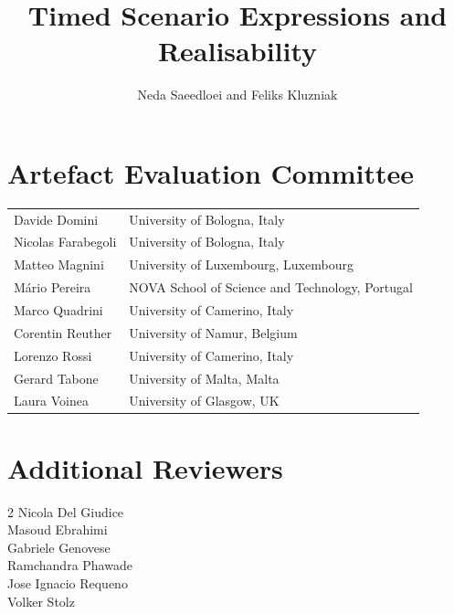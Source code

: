 \documentclass[runningheads]{llncs}
\begin{document}
\section*{Artefact Evaluation Committee}
\begin{longtable}{p{}p{}}
Davide Domini & University of Bologna, Italy \\
Nicolas Farabegoli & University of Bologna, Italy\\
Matteo Magnini & University of Luxembourg, Luxembourg\\
Mário Pereira & NOVA School of Science and Technology, Portugal\\
Marco Quadrini & University of Camerino, Italy\\
Corentin Reuther & University of Namur, Belgium \\
Lorenzo Rossi & University of Camerino, Italy \\
Gerard Tabone & University of Malta, Malta\\
Laura Voinea & University of Glasgow, UK
\end{longtable}

\section*{Additional Reviewers}
\begin{multicols}{2}
\noindent Nicola Del Giudice \\
Masoud Ebrahimi \\
Gabriele Genovese \\
Ramchandra Phawade \\
Jose Ignacio Requeno\\
Volker Stolz \\
\end{multicols}

\tableofcontents

\mainmatter


\setcounter{page}{1}


\setcounter{page}{1}
\author{Neda Saeedloei and Feliks Kluzniak}
\title{Timed Scenario Expressions and Realisability}
\maketitle
\clearpage
\end{document}
